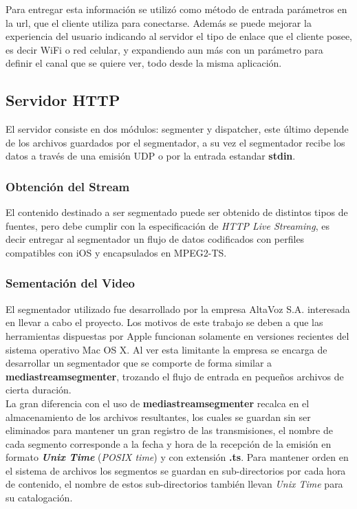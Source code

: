 	Para entregar esta información se utilizó como método de entrada parámetros en la url, que el cliente utiliza para conectarse. Además se puede mejorar la experiencia del usuario indicando al servidor el tipo de enlace que el cliente posee, es decir WiFi o red celular, y expandiendo aun más con un parámetro para definir el canal que se quiere ver, todo desde la misma aplicación.
	
	\subsection{Servidor HTTP}
	El servidor consiste en dos módulos: segmenter y dispatcher, este último depende de los archivos guardados por el segmentador, a su vez el segmentador recibe los datos a través de una emisión UDP o por la entrada estandar \textbf{stdin}.
		\subsubsection{Obtención del Stream}
El contenido destinado a ser segmentado puede ser obtenido de distintos tipos de fuentes, pero debe cumplir con la especificación de \textit{HTTP Live Streaming}, es decir entregar al segmentador un flujo de datos codificados con perfiles compatibles con iOS y encapsulados en MPEG2-TS.
		\subsubsection{Sementación del Video}

El segmentador utilizado fue desarrollado por la empresa AltaVoz S.A. interesada en llevar a cabo el proyecto. Los motivos de este trabajo se deben a que las herramientas dispuestas por Apple funcionan solamente en versiones recientes del sistema operativo Mac OS X. Al ver esta limitante la empresa se encarga de desarrollar un segmentador que se comporte de forma similar a \textbf{mediastreamsegmenter}, trozando el flujo de entrada en pequeños archivos de cierta duración.\\

 La gran diferencia con el uso de \textbf{mediastreamsegmenter} recalca en el almacenamiento de los archivos resultantes, los cuales se guardan sin ser eliminados para mantener un gran registro de las transmisiones, el nombre de cada segmento corresponde a la fecha y hora de la recepción de la emisión en formato \textit{\textbf{Unix Time}} (\textit{POSIX time}) y con extensión \textbf{.ts}. Para mantener orden en el sistema de archivos los segmentos se guardan en sub-directorios por cada hora de contenido, el nombre de estos sub-directorios también llevan \textit{Unix Time} para su catalogación.\\

